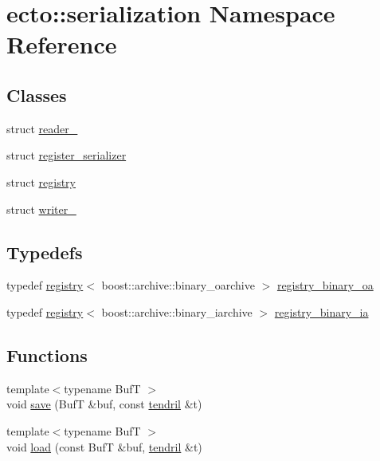 \hypertarget{namespaceecto_1_1serialization}{}\section{ecto\+:\+:serialization Namespace Reference}
\label{namespaceecto_1_1serialization}
\subsection*{Classes}
\begin{DoxyCompactItemize}
\item 
struct \hyperlink{structecto_1_1serialization_1_1reader__}{reader\+\_\+}
\item 
struct \hyperlink{structecto_1_1serialization_1_1register__serializer}{register\+\_\+serializer}
\item 
struct \hyperlink{structecto_1_1serialization_1_1registry}{registry}
\item 
struct \hyperlink{structecto_1_1serialization_1_1writer__}{writer\+\_\+}
\end{DoxyCompactItemize}
\subsection*{Typedefs}
\begin{DoxyCompactItemize}
\item 
typedef \hyperlink{structecto_1_1serialization_1_1registry}{registry}$<$ boost\+::archive\+::binary\+\_\+oarchive $>$ \hyperlink{namespaceecto_1_1serialization_ad544c8b5416e0ecfe692922b2f2e8e54}{registry\+\_\+binary\+\_\+oa}
\item 
typedef \hyperlink{structecto_1_1serialization_1_1registry}{registry}$<$ boost\+::archive\+::binary\+\_\+iarchive $>$ \hyperlink{namespaceecto_1_1serialization_a465425ff3a756de86571c1262f22d2ba}{registry\+\_\+binary\+\_\+ia}
\end{DoxyCompactItemize}
\subsection*{Functions}
\begin{DoxyCompactItemize}
\item 
{\footnotesize template$<$typename Buf\+T $>$ }\\void \hyperlink{namespaceecto_1_1serialization_a77b3e77a54adf1a888736007260a9343}{save} (Buf\+T \&buf, const \hyperlink{classecto_1_1tendril}{tendril} \&t)
\item 
{\footnotesize template$<$typename Buf\+T $>$ }\\void \hyperlink{namespaceecto_1_1serialization_a1960d58009e397c926055229f8e1c347}{load} (const Buf\+T \&buf, \hyperlink{classecto_1_1tendril}{tendril} \&t)
\end{DoxyCompactItemize}


